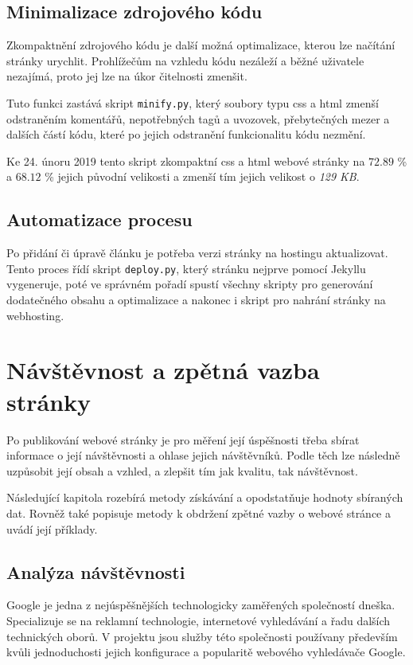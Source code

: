 \documentclass[a4paper, 12pt]{article}
\begin{document}
  \subsection{Minimalizace zdrojového kódu}
  Zkompaktnění zdrojového kódu je další možná optimalizace, kterou lze načítání stránky urychlit. Prohlížečům na vzhledu kódu nezáleží a běžné uživatele nezajímá, proto jej lze na úkor čitelnosti zmenšit.

  Tuto funkci zastává skript \texttt{minify.py}, který soubory typu \gls{css} a \gls{html} zmenší odstraněním komentářů, nepotřebných tagů a uvozovek, přebytečných mezer a dalších částí kódu, které po jejich odstranění funkcionalitu kódu nezmění.

  Ke 24. únoru 2019 tento skript zkompaktní \gls{css} a \gls{html} webové stránky na $72.89$ \% a $68.12$ \% jejich původní velikosti a zmenší tím jejich velikost o \emph{129 KB}.


  \subsection{Automatizace procesu}
  Po přidání či úpravě článku je potřeba verzi stránky na hostingu aktualizovat. Tento proces řídí skript \texttt{deploy.py}, který stránku nejprve pomocí Jekyllu vygeneruje, poté ve správném pořadí spustí všechny skripty pro generování dodatečného obsahu a optimalizace a nakonec i skript pro nahrání stránky na webhosting.


  \section{Návštěvnost a zpětná vazba stránky}
  Po publikování webové stránky je pro měření její úspěšnosti třeba sbírat informace o její návštěvnosti a ohlase jejich návštěvníků. Podle těch lze následně uzpůsobit její obsah a vzhled, a zlepšit tím jak kvalitu, tak návštěvnost.

  Následující kapitola rozebírá metody získávání a opodstatňuje hodnoty sbíraných dat. Rovněž také popisuje metody k obdržení zpětné vazby o webové stránce a uvádí její příklady.


  \subsection{Analýza návštěvnosti}
  Google je jedna z nejúspěšnějších technologicky zaměřených společností dneška. Specializuje se na reklamní technologie, internetové vyhledávání a řadu dalších technických oborů. V projektu jsou služby této společnosti používany především kvůli jednoduchosti jejich konfigurace a popularitě webového vyhledávače Google.
\end{document}
